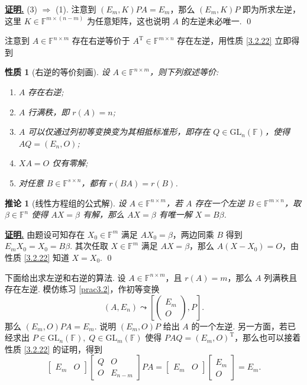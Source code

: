 \documentclass[10pt,openany]{article}
\theoremstyle{thmstyle} %
\theoremstyle{defstyle} %
\newtheorem{corollary}[theorem]{推论}
\theoremstyle{prostyle} %
\newtheorem{property}[theorem]{性质}
\theoremstyle{exastyle}
\theoremstyle{remstyle}
\renewenvironment{proof}[1][证明]{\par\underline{\textbf{#1.}} \;\fangsong}{\qed\par}
\newcommand{\T}{^{\text{T}}}
\newcommand{\F}{\mathbb{F}}
\newcommand{\gfn}{\text{GL}_n(\mathbb{F})}
\newcommand{\gfm}{\text{GL}_m(\mathbb{F})}
\newcommand{\mn}{^{m \times n}}
\newcommand{\nm}{^{n \times m}}
\begin{document}
\begin{proof}
	 (3) \( \Rightarrow \) (1). 注意到  \( (E_m,K)PA=E_m \)，那么 \( (E_m,K)P \) 即为所求左逆，这里 \( K \in \F^{m \times (n-m)} \) 为任意矩阵，这也说明 \( A \) 的左逆未必唯一.
\end{proof}

注意到 \( A \in \F\nm \) 存在右逆等价于 \( A\T \in \F\mn \) 存在左逆，用性质  \ref{3.2.22} 立即得到

\begin{property}[右逆的等价刻画] \label{3.2.23}
	设 \( A \in \F\nm \)，则下列叙述等价:
	\begin{enumerate}[(1)]
		\item \( A \) 存在右逆;
		\item \( A \) 行满秩，即 \( r(A)=n \);
		\item \( A \) 可以仅通过列初等变换变为其相抵标准形，即存在 \( Q \in \gfn \)，使得 \( AQ=(E_n,O) \);
		\item \( XA=O \) 仅有零解;
		\item 对任意 \( B \in \F^{s \times n} \)，都有 \( r(BA)=r(B) \).
	\end{enumerate}
\end{property}

\begin{corollary}[线性方程组的公式解] \label{3.2.24}
	设 \( A \in \F\nm \)，若 \( A \) 存在一个左逆 \( B \in \F\mn \)，取 \( \beta \in \F^n \) 使得 \( AX=\beta \) 有解，那么 \( AX=\beta \) 有唯一解 \( X=B \beta \).
\end{corollary}

\begin{proof}
	由题设可知存在 \( X_0 \in \F^m \) 满足 \( AX_0=\beta \)，两边同乘 \( B \) 得到 \( E_mX_0=X_0=B\beta \). 其次任取 \( X \in \F^m \) 满足 \( AX=\beta \)，那么 \( A(X-X_0)=O \)，由性质 \ref{3.2.22} 知道 \( X=X_0 \). 
\end{proof}

下面给出求左逆和右逆的算法. 设 \( A \in \F\nm \)，且 \( r(A)=m \)，那么 \( A \) 列满秩且存在左逆. 模仿练习 \ref{prac3.2}，作初等变换
\[ (A,E_n) \leadsto \left[ \begin{pmatrix}
	E_m \\ O
\end{pmatrix}, P \right]. \]
那么 \( (E_m,O)PA=E_m \). 说明 \( (E_m,O)P \) 给出 \( A \) 的一个左逆. 另一方面，若已经求出 \( P \in \gfn, \; Q \in \gfm \) 使得 \( PAQ=(E_m,O)\T \)，那么也可以接着性质 \ref{3.2.22} 的证明，得到
\[ \begin{bmatrix}
	E_m & O
\end{bmatrix}\begin{bmatrix}
Q & O \\
O & E_{n-m}
\end{bmatrix}PA=\begin{bmatrix}
E_m & O
\end{bmatrix}\begin{bmatrix}
E_m \\ O
\end{bmatrix}=E_m. \]
\end{document}
